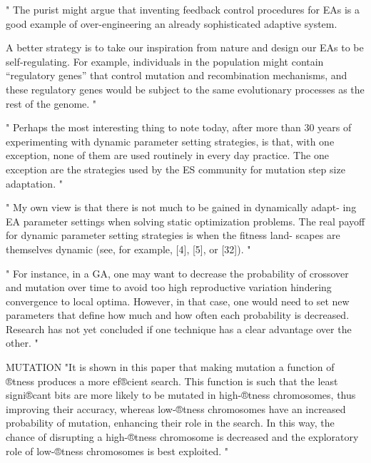 "
The purist might argue that inventing feedback control procedures for EAs is a good example of over-engineering an already sophisticated adaptive system.

A better strategy is to take our inspiration from nature and design our EAs to be self-regulating. For example, individuals in the population might contain “regulatory genes” that control mutation and recombination mechanisms, and these regulatory genes would be subject to the same evolutionary processes as the rest of the genome.
"\cite{kacprzyk_parameter_2007}



"
Perhaps the most interesting thing to note today, after more than 30 years of experimenting with dynamic parameter setting strategies, is that, with one exception, none of them are used routinely in every day practice. The one exception are the strategies used by the ES community for mutation step size adaptation.
"\cite{kacprzyk_parameter_2007}

"
My own view is that there is not much to be gained in dynamically adapt- ing EA parameter settings when solving static optimization problems. The real payoff for dynamic parameter setting strategies is when the fitness land- scapes are themselves dynamic (see, for example, [4], [5], or [32]).
"\cite{kacprzyk_parameter_2007}

"
For instance, in a GA, one may want to decrease the probability of crossover and mutation over time to avoid too high reproductive variation hindering convergence to local optima. However, in that case, one would need to set new parameters that define how much and how often each probability is decreased. Research has not yet concluded if one technique has a clear advantage over the other.
"\cite{klampfl_using_nodate}


MUTATION
"It is shown in this paper that making mutation a function of ®tness produces a more ef®cient search. This function is such that the least signi®cant bits are more likely to be mutated in high-®tness chromosomes, thus improving their accuracy, whereas low-®tness chromosomes have an increased probability of mutation, enhancing their role in the search. In this way, the chance of disrupting a high-®tness chromosome is decreased and the exploratory role of low-®tness chromosomes is best exploited.
"
\cite{marsili_libelli_adaptive_2000}

